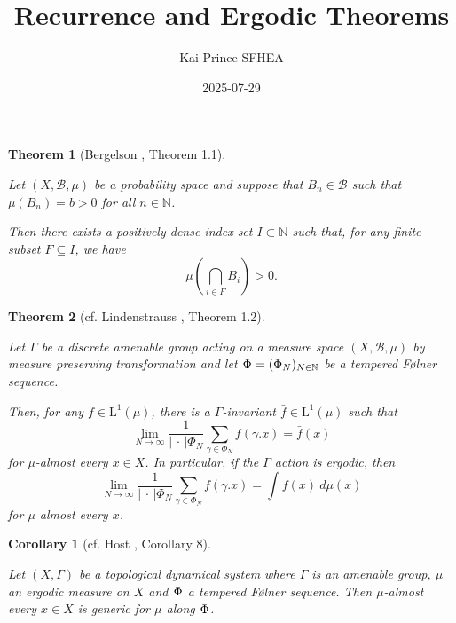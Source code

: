 \documentclass[
  british,
]{article}
\title{Recurrence and Ergodic Theorems}
\author{Kai Prince SFHEA}
\date{2025-07-29}
\renewcommand*\contentsname{Table of contents}
\newcommand\contentsname{Table of contents}
\theoremstyle{plain}
\newtheorem{theorem}{Theorem}[section]
\theoremstyle{plain}
\newtheorem{corollary}{Corollary}[section]
\theoremstyle{remark}
\newcommand{\AmenableGroupElement}{{\gamma}}
\newcommand{\SigmaAlgebra}[1]{{\mathscr{#1}}}
\newcommand{\AmenableGroup}{{\Gamma}}
\newcommand{\GroupAction}[2]{{#1}.{#2}}
\newcommand{\Measure}{{\mu}}
\newcommand{\CountingMeasure}[1][\,\cdot\,]{{\left|#1\right|}}
\newcommand{\Folner}[1][\vphantom{}]{{\Phi}_{#1}}
\begin{document}
\maketitle

\renewcommand*\contentsname{Table of contents}
{
\hypersetup{linkcolor=}
\setcounter{tocdepth}{3}
\tableofcontents
}

\begin{theorem}[Bergelson
, Theorem
1.1]\protect\hypertarget{thm-recurrence}{}\label{thm-recurrence}

Let \((X,\SigmaAlgebra{B},\Measure)\) be a probability space and suppose
that \(B_n\in\SigmaAlgebra{B}\) such that \(\Measure(B_n)=b>0\) for all
\(n\in\mathbb{N}\).

Then there exists a positively dense index set \(I\subset\mathbb{N}\)
such that, for any finite subset \(F\subseteq I\), we have
\[\Measure\left(\bigcap_{i\in F}B_i \right)>0. \]

\end{theorem}

\begin{theorem}[cf. Lindenstrauss
, Theorem
1.2]\protect\hypertarget{thm-GeneralisedPET}{}\label{thm-GeneralisedPET}

Let \(\AmenableGroup\) be a discrete amenable group acting on a measure
space \((X,\SigmaAlgebra{B},\Measure)\) by measure preserving
transformation and let \(\Folner=(\Folner[N])_{N\in\mathbb{N}}\) be a
tempered Følner sequence.

Then, for any \(f\in\text{L}^1(\Measure)\), there is a
\(\AmenableGroup\)-invariant \(\bar{f}\in\text{L}^1(\Measure)\) such
that
\[\lim_{N\rightarrow\infty}\frac{1}{\CountingMeasure{\Folner[N]}}\sum_{\AmenableGroupElement\in\Folner[N]}f(\GroupAction{\AmenableGroupElement}{x})=\bar{f}(x) \]
for \(\Measure\)-almost every \(x\in X\). In particular, if the
\(\AmenableGroup\) action is ergodic, then
\[\lim_{N\rightarrow\infty}\frac{1}{\CountingMeasure{\Folner[N]}}\sum_{\AmenableGroupElement\in\Folner[N]}f(\GroupAction{\AmenableGroupElement}{x})=\int f(x)\ d\Measure(x) \]
for \(\Measure\) almost every \(x\).

\end{theorem}

\begin{corollary}[cf. Host ,
Corollary
8]\protect\hypertarget{cor-temperedGeneric}{}\label{cor-temperedGeneric}

Let \((X,\AmenableGroup)\) be a topological dynamical system where
\(\AmenableGroup\) is an amenable group, \(\Measure\) an ergodic measure
on \(X\) and \(\Folner\) a tempered Følner sequence. Then
\(\Measure\)-almost every \(x\in X\) is generic for \(\Measure\) along
\(\Folner\).

\end{corollary}
\end{document}
